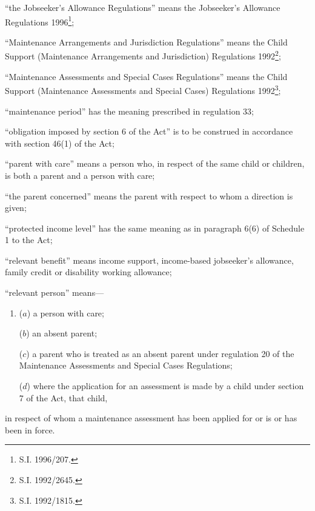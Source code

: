 \documentclass[a4paper]{article}
\begin{document}
\begin{enumerate}
“the Jobseeker’s Allowance Regulations” means the Jobseeker’s Allowance Regulations 1996\footnote{\frenchspacing S.I. 1996/207.};

“Maintenance Arrangements and Jurisdiction Regulations” means the Child Support (Maintenance Arrangements and Jurisdiction) Regulations 1992\footnote{\frenchspacing S.I. 1992/2645.};

“Maintenance Assessments and Special Cases Regulations” means the Child Support (Maintenance Assessments and Special Cases) Regulations 1992\footnote{\frenchspacing S.I. 1992/1815.};

“maintenance period” has the meaning prescribed in regulation 33;

“obligation imposed by section 6 of the Act” is to be construed in accordance with section 46(1) of the Act;

“parent with care” means a person who, in respect of the same child or children, is both a parent and a person with care;

“the parent concerned” means the parent with respect to whom a direction is given;

“protected income level” has the same meaning as in paragraph 6(6) of Schedule 1 to the Act;

“relevant benefit” means income support, 
income-based jobseeker’s allowance,  %
family credit or disability working allowance;

“relevant person” means—
\begin{enumerate}\item[]
($a$) a person with care;

($b$) an absent parent;

($c$) a parent who is treated as an absent parent under regulation 20 of the Maintenance Assessments and Special Cases Regulations;

($d$) where the application for an assessment is made by a child under section 7 of the Act, that child,
\end{enumerate}
in respect of whom a maintenance assessment has been applied for or is or has been in force.
\end{enumerate}
\end{document}
